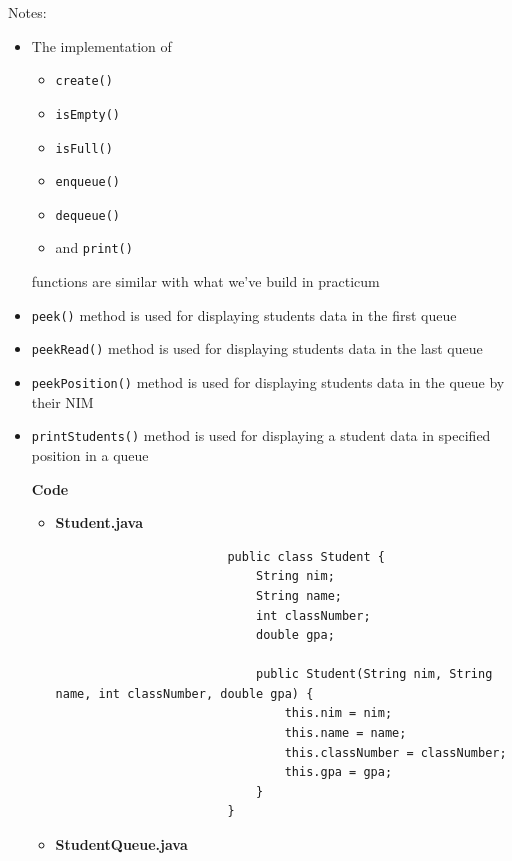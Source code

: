 \documentclass[12pt,titlepage]{article}
\begin{document}
\begin{enumerate}
{        Notes:
        \begin{itemize}
            \item {
                The implementation of 
                \begin{itemize}
                    \item \texttt{create()}
                    \item \texttt{isEmpty()} 
                    \item \texttt{isFull()}
                    \item \texttt{enqueue()}
                    \item \texttt{dequeue()}
                    \item and \texttt{print()}
                \end{itemize}
                functions are similar with what we've build in practicum
            }
            \item {
                \texttt{peek()} method is used for displaying students data in the first queue
            }
            \item {
                \texttt{peekRead()} method is used for displaying students data in the last queue
            }
            \item {
                \texttt{peekPosition()} method is used for displaying students data in the queue by their NIM
            }
            \item {
                \texttt{printStudents()} method is used for displaying a student data in specified position in a queue
            }

            \large{\textbf{Code}}
            \begin{itemize}
                \item {
                    \textbf{Student.java}

                    \begin{verbatim}
                        public class Student {
                            String nim;
                            String name;
                            int classNumber;
                            double gpa;

                            public Student(String nim, String name, int classNumber, double gpa) {
                                this.nim = nim;
                                this.name = name;
                                this.classNumber = classNumber;
                                this.gpa = gpa;
                            }
                        }
                    \end{verbatim}
                }
                \item {
                    \textbf{StudentQueue.java}

}
\end{itemize}
\end{itemize}}
\end{enumerate}
\end{document}
